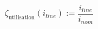 \begin{equation}
	\zeta_\text{utilisation}(i_{line}) := \frac{i_{line}}{i_{nom}}
	\label{ch1:equ:cable-utilisation}
\end{equation}